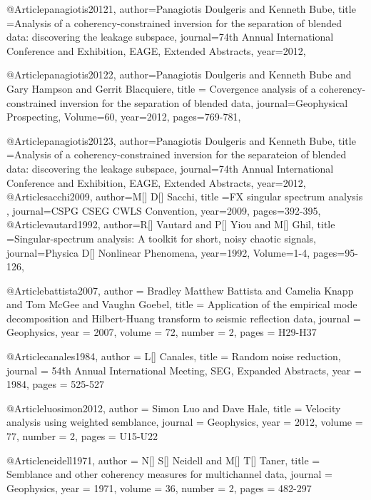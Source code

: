 @Article{panagiotis20121,
  author={Panagiotis Doulgeris and Kenneth Bube},
  title ={Analysis of a coherency-constrained inversion for the separation of blended data: discovering the leakage subspace},
  journal={74th Annual International Conference and Exhibition, EAGE, Extended Abstracts},
  year=2012,
  }

@Article{panagiotis20122,
  author={Panagiotis Doulgeris and Kenneth Bube and Gary Hampson and Gerrit Blacquiere},
  title = {Covergence analysis of a coherency-constrained inversion for the separation of blended data},
  journal={Geophysical Prospecting},
  Volume=60,
  year=2012,
  pages={769-781},
}

@Article{panagiotis20123,
  author={Panagiotis Doulgeris and Kenneth Bube},
  title ={Analysis of a coherency-constrained inversion for the separateion of blended data: discovering the leakage subspace},
  journal={74th Annual International Conference and Exhibition, EAGE, Extended Abstracts},
  year=2012,
  }
@Article{sacchi2009,
  author={M[] D[] Sacchi},
  title ={{FX} singular spectrum analysis },
  journal={CSPG CSEG CWLS Convention},
  year=2009,
  pages={392-395},
}
@Article{vautard1992,
  author={R[] Vautard and P[] Yiou and M[] Ghil},
  title ={Singular-spectrum analysis: A toolkit for short, noisy chaotic signals},
  journal={Physica D[] Nonlinear Phenomena},
  year=1992,
  Volume=1-4,
  pages={95-126},
}

@Article{battista2007,
  author = 	 {Bradley Matthew Battista and Camelia Knapp and Tom McGee and Vaughn Goebel},
  title = 	 {Application of the empirical mode decomposition and
{Hilbert-Huang} transform to seismic reflection data},
  journal = 	 {Geophysics},
  year = 	 2007,
  volume = 	 72,
  number = 	 2,
  pages = 	 {H29-H37}}

@Article{canales1984,
  author = 	 {L[] Canales},
  title = 	 {Random noise reduction},
  journal = 	 {54th Annual International Meeting, SEG, Expanded Abstracts},
  year = 	 1984,
  pages =	 {525-527}
}

@Article{luosimon2012,
  author = 	 {Simon Luo and Dave Hale},
  title = 	 {Velocity analysis using weighted semblance},
  journal = 	 {Geophysics},
  year = 	 2012,
  volume = 	 77,
  number = 	 2,
  pages = 	 {U15-U22}}


@Article{neidell1971,
  author = 	 {N[] S[] Neidell and M[] T[] Taner},
  title = 	 {Semblance and other coherency measures for multichannel data},
  journal = 	 {Geophysics},
  year = 	 1971,
  volume = 	 36,
  number = 	 2,
  pages = 	 {482-297}}


